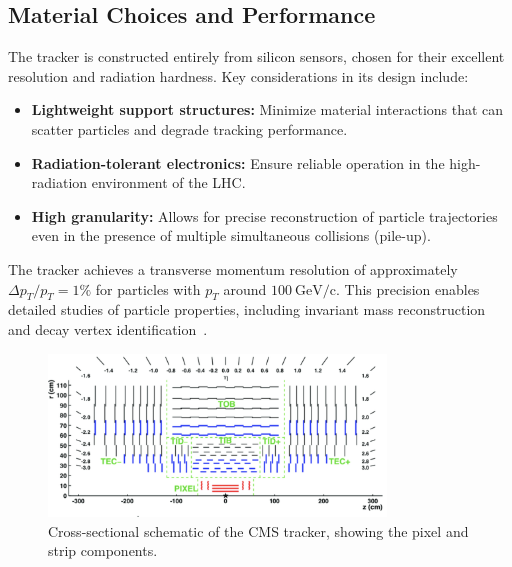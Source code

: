 \subsection{Material Choices and Performance}
The tracker is constructed entirely from silicon sensors, chosen for their excellent resolution and radiation hardness. Key considerations in its design include:
\begin{itemize}
\item \textbf{Lightweight support structures:} Minimize material interactions that can scatter particles and degrade tracking performance.
\item \textbf{Radiation-tolerant electronics:} Ensure reliable operation in the high-radiation environment of the LHC.
\item \textbf{High granularity:} Allows for precise reconstruction of particle trajectories even in the presence of multiple simultaneous collisions (pile-up).
\end{itemize}

The tracker achieves a transverse momentum resolution of approximately $\Delta p_T / p_T = 1\%$ for particles with $p_T$ around $100~\mathrm{GeV/c}$. This precision enables detailed studies of particle properties, including invariant mass reconstruction and decay vertex identification~\cite{tracker_tdr}.


\begin{figure}[ht]
    \centering
    \includegraphics[width=0.8\textwidth]{Figures/tracker_cross.png} %
    \caption{Cross-sectional schematic of the CMS tracker, showing the pixel and strip components.}
    \label{fig:cms_tracker}
\end{figure}

